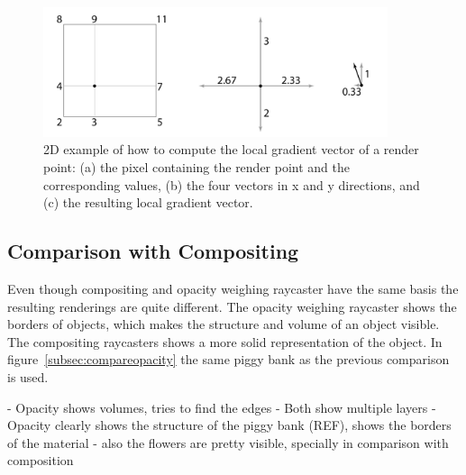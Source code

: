 

\begin{figure}[h!]
    \centering
    \captionsetup{justification=centering,margin=0.5cm}
    \includegraphics[width=0.9\textwidth]{img/local_gradient_vector.pdf}
    \caption{2D example of how to compute the local gradient vector of a render point: (a) the pixel containing the render point and the corresponding values, (b) the four vectors in x and y directions, and (c) the resulting local gradient vector.}
    \label{fig:vector}
\end{figure}


\subsection{Comparison with Compositing}\label{subsec:opacity_compare}

Even though compositing and opacity weighing raycaster have the same basis the resulting renderings are quite different.
The opacity weighing raycaster shows the borders of objects, which makes the structure and volume of an object visible.
The compositing raycasters shows a more solid representation of the object.
In figure~\ref{subsec:compareopacity} the same piggy bank as the previous comparison is used.



- Opacity shows volumes, tries to find the edges
- Both show multiple layers
- Opacity clearly shows the structure of the piggy bank (REF), shows the borders of the material
- also the flowers are pretty visible, specially in comparison with composition



